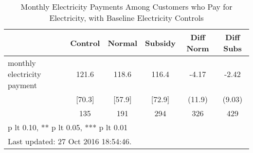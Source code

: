 \begin{table}[htbp]\centering
\def\sym#1{\ifmmode^{#1}\else\(^{#1}\)\fi}
\caption{Monthly Electricity Payments Among Customers who Pay for Electricity, with Baseline Electricity Controls \label{tab:"balance"}}
\begin{tabular*}{0.9\hsize}{@{\hskip\tabcolsep\extracolsep\fill}l*{1}{ccccc}}
\toprule
                                &  Control&   Normal&  Subsidy&Diff Norm         &Diff Subs         \\
\midrule
monthly electricity payment     &    121.6&    118.6&    116.4&    -4.17         &    -2.42         \\
                                &   [70.3]&   [57.9]&   [72.9]&   (11.9)         &   (9.03)         \\
                                &      135&      191&      294&      326         &      429         \\
\bottomrule
\multicolumn{6}{l}{\footnotesize * p lt 0.10, ** p lt 0.05, *** p lt 0.01}\\
\multicolumn{6}{l}{\footnotesize Last updated: 27 Oct 2016 18:54:46.}\\
\end{tabular*}
\end{table}

